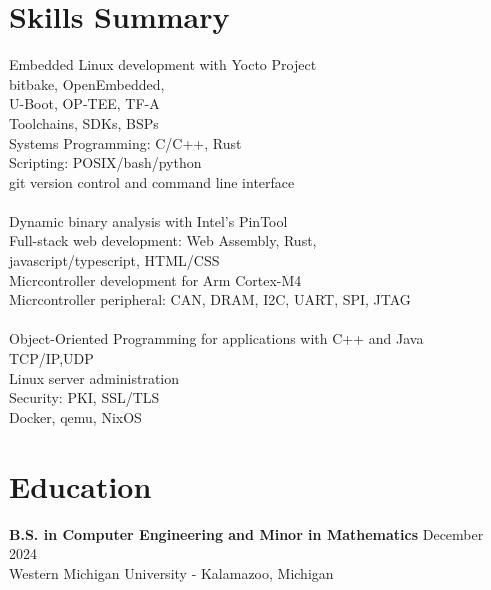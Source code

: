 \documentclass[letter,12pt]{article}
\begin{document}
\section*{Skills Summary}
\vspace{-.5cm}
\begin{tcolorbox}
  [colback=gray!25,
  leftrule=0pt,
  rightrule=0pt,
  sharp corners]
\vspace{-.125cm}
  \begin{multicols}{3}
  \textbullet \- Embedded Linux development with Yocto Project\\
  \textbullet \- bitbake, OpenEmbedded, \\
    U-Boot, OP-TEE, TF-A\\
  \textbullet \- Toolchains, SDKs, BSPs \\
  \textbullet \- Systems Programming: C/C++, Rust \\
  \textbullet \- Scripting: POSIX/bash/python \\
  \textbullet \- git version control and command line interface \\
  \columnbreak\\
  \textbullet \- Dynamic binary analysis with Intel's PinTool\\
  \textbullet \- Full-stack web development: Web Assembly, Rust,\\
    javascript/typescript, HTML/CSS\\
  \textbullet \- Micrcontroller development for Arm Cortex-M4\\
  \textbullet \- Micrcontroller peripheral: CAN, DRAM, I2C, UART, SPI, JTAG\\
  \columnbreak\\
  \textbullet \- Object-Oriented Programming for applications 
    with C++ and Java \\
  \textbullet \- TCP/IP,UDP \\
  \textbullet \- Linux server administration \\
  \textbullet \- Security: PKI, SSL/TLS\\
  \textbullet \- Docker, qemu, NixOS\\
  \end{multicols}
    
\vspace{-1.00cm}
\end{tcolorbox}

\vspace{-0.50cm}
\section*{Education} 
\vspace{-.25cm}
\textbf{B.S. in Computer Engineering and Minor in Mathematics} 
\hfill December 2024\\
Western Michigan University - Kalamazoo, Michigan\\ 
\end{document}
